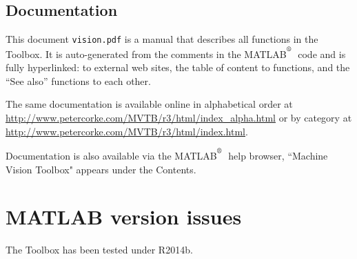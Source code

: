 \documentclass[a4paper]{report}
\def\Mlab{MATLAB$^{\textsuperscript{\textregistered}}$}
\begin{document}
\subsection{Documentation}

This document {\tt vision.pdf} is a manual that describes all functions in the Toolbox.
It is auto-generated from the comments in the \Mlab\ code and is fully hyperlinked:
to external web sites, the table of content to functions, and the ``See also'' functions
to each other.

The same documentation is available online in
alphabetical order at \url{http://www.petercorke.com/MVTB/r3/html/index_alpha.html}
or by category at \url{http://www.petercorke.com/MVTB/r3/html/index.html}.

Documentation is also available via the \Mlab\ help browser, ``Machine
Vision Toolbox" appears under the Contents.

\section{MATLAB version issues}
The Toolbox has been tested under R2014b.
\end{document}
